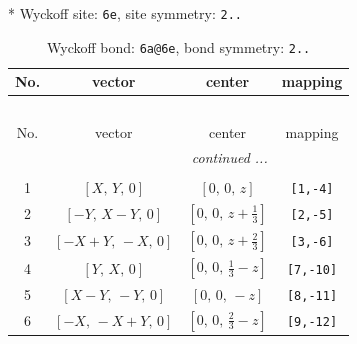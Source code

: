 \documentclass[fleqn,8pt]{jsarticle}
\begin{document}
* Wyckoff site: {\tt 6e}, site symmetry: {\tt 2..}
\renewcommand{\arraystretch}{1.2}
\begin{longtable}{cccc}
\caption{Wyckoff bond: {\tt 6a@6e}, bond symmetry: {\tt 2..}}
 \\
 \hline \hline
No. & vector & center & mapping \\ \hline \endfirsthead

\multicolumn{3}{l}{\tablename\ \thetable{}} \\
 \hline \hline
No. & vector & center & mapping \\ \hline \endhead

 \hline \hline
\multicolumn{3}{r}{\footnotesize\it continued ...} \\ \endfoot

 \hline \hline
\multicolumn{3}{r}{} \\ \endlastfoot

1 & $\left[ X,\, Y,\, 0 \right]$ & $\left[ 0,\, 0,\, z \right]$ & {\tt [1,-4]} \\ \hline
2 & $\left[ - Y,\, X - Y,\, 0 \right]$ & $\left[ 0,\, 0,\, z + \frac{1}{3} \right]$ & {\tt [2,-5]} \\ \hline
3 & $\left[ - X + Y,\, - X,\, 0 \right]$ & $\left[ 0,\, 0,\, z + \frac{2}{3} \right]$ & {\tt [3,-6]} \\ \hline
4 & $\left[ Y,\, X,\, 0 \right]$ & $\left[ 0,\, 0,\, \frac{1}{3} - z \right]$ & {\tt [7,-10]} \\ \hline
5 & $\left[ X - Y,\, - Y,\, 0 \right]$ & $\left[ 0,\, 0,\, - z \right]$ & {\tt [8,-11]} \\ \hline
6 & $\left[ - X,\, - X + Y,\, 0 \right]$ & $\left[ 0,\, 0,\, \frac{2}{3} - z \right]$ & {\tt [9,-12]} \\
\end{longtable}
\renewcommand{\arraystretch}{1.2}
\end{document}
